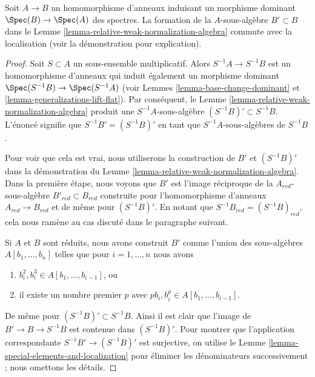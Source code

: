 \begin{lemma}
\label{lemma-relative-weak-normalization-localization}
Soit $A \to B$ un homomorphisme d'anneaux induisant un morphisme
dominant $\Spec(B) \to \Spec(A)$ des spectres. La formation de la $A$-sous-algèbre
$B' \subset B$ dans le Lemme \ref{lemma-relative-weak-normalization-algebra} commute avec la
localisation (voir la démonstration pour explication).
\end{lemma}

\begin{proof}
Soit $S \subset A$ un sous-ensemble multiplicatif. Alors $S^{-1}A \to S^{-1}B$
est un homomorphisme d'anneaux qui induit également un morphisme
dominant $\Spec(S^{-1}B) \to \Spec(S^{-1}A)$ (voir Lemmes \ref{lemma-base-change-dominant}
et \ref{lemma-generalizations-lift-flat}). Par conséquent,
le Lemme \ref{lemma-relative-weak-normalization-algebra} produit une $S^{-1}A$-sous-algèbre
$(S^{-1}B)' \subset S^{-1}B$. L'énoncé signifie
que $S^{-1}B' = (S^{-1}B)'$ en tant que $S^{-1}A$-sous-algèbres de
$S^{-1}B$.

\medskip\noindent
Pour voir que cela est vrai, nous utiliserons la construction
de $B'$ et $(S^{-1}B)'$
dans la démonstration du Lemme \ref{lemma-relative-weak-normalization-algebra}. Dans
la première étape, nous voyons que $B'$ est l'image
réciproque de la $A_{red}$-sous-algèbre $B'_{red} \subset B_{red}$ construite
pour l'homomorphisme d'anneaux $A_{red} \to B_{red}$ et de même pour
$(S^{-1}B)'$. En notant que $S^{-1}B_{red} = (S^{-1}B)_{red}$, cela nous ramène
au cas discuté dans le paragraphe suivant.

\medskip\noindent Si
$A$ et $B$ sont réduits, nous avons construit $B'$
comme l'union des sous-algèbres $A[b_1, \ldots, b_n]$ telles que pour $i = 1, \ldots, n$ nous
avons
\begin{enumerate}
\item $b_i^2, b_i^3 \in A[b_1, \ldots, b_{i - 1}]$, ou
\item il existe un nombre premier
$p$ avec $pb_i, b_i^p \in A[b_1, \ldots, b_{i - 1}]$.
\end{enumerate}
De même pour $(S^{-1}B)' \subset S^{-1}B$. Ainsi il est clair que l'image de $B' \to B \to S^{-1}B$
est contenue dans $(S^{-1}B)'$. Pour montrer que
l'application correspondante $S^{-1}B' \to (S^{-1}B)'$ est surjective,
on utilise le Lemme \ref{lemma-special-elements-and-localization} pour éliminer les dénominateurs
successivement ; nous omettons les détails.
\end{proof}

